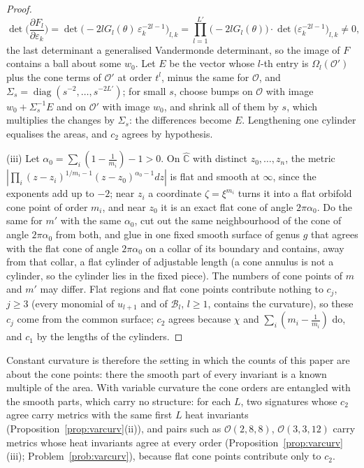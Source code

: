 \documentclass[pdflatex,sn-mathphys-num]{sn-jnl}
\theoremstyle{thmstyleone}%
\theoremstyle{thmstylethree}%
\newcommand{\Orb}{\mathcal{O}}
\begin{document}
\begin{proof}
\[
\det\Big(\frac{\partial F_l}{\partial\varepsilon_k}\Big)=\det\big(-2lG_l(\theta)\,\varepsilon_k^{-2l-1}\big)_{l,k}=\prod_{l=1}^{L'}\big(-2lG_l(\theta)\big)\cdot\det\big(\varepsilon_k^{-2l-1}\big)_{l,k}\ne0,
\]
the last determinant a generalised Vandermonde determinant, so the image of $F$ contains a ball about some $w_0$. Let $E$ be the vector whose $l$-th entry is $\Omega_l(\Orb')$ plus the cone terms of $\Orb'$ at order $t^l$, minus the same for $\Orb$, and $\Sigma_s=\operatorname{diag}(s^{-2},\dots,s^{-2L'})$; for small $s$, choose bumps on $\Orb$ with image $w_0+\Sigma_s^{-1}E$ and on $\Orb'$ with image $w_0$, and shrink all of them by $s$, which multiplies the changes by $\Sigma_s$: the differences become $E$. Lengthening one cylinder equalises the areas, and $c_2$ agrees by hypothesis.

(iii) Let $\alpha_0=\sum_i(1-\frac1{m_i})-1>0$. On $\hat{\mathbb C}$ with distinct $z_0,\dots,z_n$, the metric $|\prod_i(z-z_i)^{1/m_i-1}(z-z_0)^{\alpha_0-1}dz|$ is flat and smooth at $\infty$, since the exponents add up to $-2$; near $z_i$ a coordinate $\zeta=\xi^{m_i}$ turns it into a flat orbifold cone point of order $m_i$, and near $z_0$ it is an exact flat cone of angle $2\pi\alpha_0$. Do the same for $m'$ with the same $\alpha_0$, cut out the same neighbourhood of the cone of angle $2\pi\alpha_0$ from both, and glue in one fixed smooth surface of genus $g$ that agrees with the flat cone of angle $2\pi\alpha_0$ on a collar of its boundary and contains, away from that collar, a flat cylinder of adjustable length (a cone annulus is not a cylinder, so the cylinder lies in the fixed piece). The numbers of cone points of $m$ and $m'$ may differ. Flat regions and flat cone points contribute nothing to $c_j$, $j\ge3$ (every monomial of $u_{l+1}$ and of $\mathcal B_l$, $l\ge1$, contains the curvature), so these $c_j$ come from the common surface; $c_2$ agrees because $\chi$ and $\sum_i(m_i-\frac1{m_i})$ do, and $c_1$ by the lengths of the cylinders.
\end{proof}


Constant curvature is therefore the setting in which the counts of this paper are about the cone points: there the smooth part of every invariant is a known multiple of the area. With variable curvature the cone orders are entangled with the smooth parts, which carry no structure: for each $L$, two signatures whose $c_2$ agree carry metrics with the same first $L$ heat invariants (Proposition~\ref{prop:varcurv}(ii)), and pairs such as $\Orb(2,8,8)$, $\Orb(3,3,12)$ carry metrics whose heat invariants agree at every order (Proposition~\ref{prop:varcurv}(iii); Problem~\ref{prob:varcurv}), because flat cone points contribute only to $c_2$.
\end{document}
